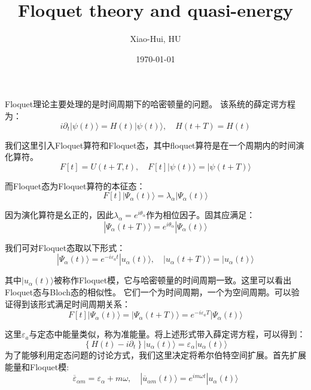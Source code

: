 \documentclass{article}
\title{Floquet theory and quasi-energy}
\author{Xiao-Hui, HU}
\date{\today}
\begin{document}
    \maketitle
    
    Floquet理论主要处理的是时间周期下的哈密顿量的问题。
    该系统的薛定谔方程为：
    \begin{equation}
        i \partial_{t} | \psi(t) \rangle=H(t) | \psi(t) \rangle, \quad H(t+T)=H(t)
    \end{equation}

    我们这里引入Floquet算符和Floquet态，其中floquet算符是在一个周期内的时间演化算符。
    \begin{equation}
        F[t]=U(t+T, t), \quad F[t] | \psi(t) \rangle=| \psi(t+T) \rangle
    \end{equation}

    而Floquet态为Floquet算符的本征态：
    \begin{equation}
        F[t] | \Psi_{\alpha}(t) \rangle=\lambda_{\alpha} | \Psi_{\alpha}(t) \rangle
    \end{equation}

    因为演化算符是幺正的，因此$\lambda_{\alpha}=e^{i \theta_{\alpha}}$作为相位因子。固其应满足：
    \begin{equation}
        | \Psi_{\alpha}(t+T) \rangle=e^{i \theta_{\alpha}} | \Psi_{\alpha}(t) \rangle
    \end{equation}

    我们可对Floquet态取以下形式：
    \begin{equation}
        | \Psi_{\alpha}(t) \rangle=e^{-i \varepsilon_{a} t} | u_{\alpha}(t) \rangle, \quad | u_{\alpha}(t+T) \rangle=| u_{\alpha}(t) \rangle
    \end{equation}

    其中$| u_{\alpha}(t) \rangle$被称作Floquet模，它与哈密顿量的时间周期一致。这里可以看出Floquet态与Bloch态的相似性。
    它们一个为时间周期，一个为空间周期。可以验证得到该形式满足时间周期关系：
    \begin{equation}
        F[t] | \Psi_{\alpha}(t) \rangle=| \Psi_{\alpha}(t+T) \rangle=e^{-i \varepsilon_{a} T} | \Psi_{\alpha}(t) \rangle
    \end{equation}

    这里$ \varepsilon_{a}$与定态中能量类似，称为准能量。将上述形式带入薛定谔方程，可以得到：
    \begin{equation}
        \left\{H(t)-i \partial_{t}\right\} | u_{\alpha}(t) \rangle=\varepsilon_{\alpha} | u_{\alpha}(t) \rangle
    \end{equation}
    为了能够利用定态问题的讨论方式，我们这里决定将希尔伯特空间扩展。首先扩展能量和Floquet模:
    \begin{equation}
        \overline{\varepsilon}_{\alpha m}=\varepsilon_{\alpha}+m \omega, \quad | \overline{u}_{\alpha m}(t) \rangle=e^{i m \omega t} | u_{\alpha}(t) \rangle
    \end{equation}
\end{document}
